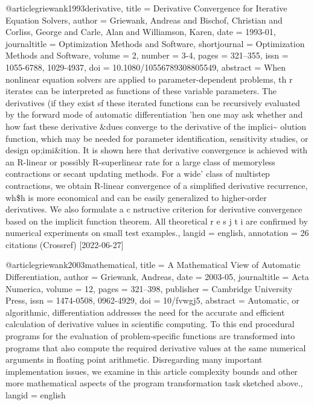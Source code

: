 @article{griewank1993derivative,
  title = {Derivative Convergence for Iterative Equation Solvers},
  author = {Griewank, Andreas and Bischof, Christian and Corliss, George and Carle, Alan and Williamson, Karen},
  date = {1993-01},
  journaltitle = {Optimization Methods and Software},
  shortjournal = {Optimization Methods and Software},
  volume = {2},
  number = {3-4},
  pages = {321--355},
  issn = {1055-6788, 1029-4937},
  doi = {10.1080/10556789308805549},
  abstract = {When nonlinear equation solvers are applied to parameter-dependent problems, th r iterates can be interpreted as functions of these variable parameters. The derivatives (if they exist sf these iterated functions can be recursively evaluated by the forward mode of automatic differentiation 'hen one may ask whether and how fast these derivative \&dues converge to the derivative of the implici\textasciitilde{} olution function, which may be needed for parameter identification, sensitivity studies, or design op;imi\&ition. It is shown here that derivative convergence is achieved with an R-linear or possibly R-superlinear rate for a large class of memoryless contractions or secant updating methods. For a wide' class of multistep contractions, we obtain R-linear convergence of a simplified derivative recurrence, wh\$h is more economical and can be easily generalized to higher-order derivatives. We also formulate a c nstructive criterion for derivative convergence based on the implicit function theorem. All theoretical r e s j t i are confirmed by numerical experiments on small test examples.},
  langid = {english},
  annotation = {26 citations (Crossref) [2022-06-27]}
}

@article{griewank2003mathematical,
  title = {A Mathematical View of Automatic Differentiation},
  author = {Griewank, Andreas},
  date = {2003-05},
  journaltitle = {Acta Numerica},
  volume = {12},
  pages = {321--398},
  publisher = {Cambridge University Press},
  issn = {1474-0508, 0962-4929},
  doi = {10/fvwgj5},
  abstract = {Automatic, or algorithmic, differentiation addresses the need for the accurate and efficient calculation of derivative values in scientific computing. To this end procedural programs for the evaluation of problem-specific functions are transformed into programs that also compute the required derivative values at the same numerical arguments in floating point arithmetic. Disregarding many important implementation issues, we examine in this article complexity bounds and other more mathematical aspects of the program transformation task sketched above.},
  langid = {english}
}

